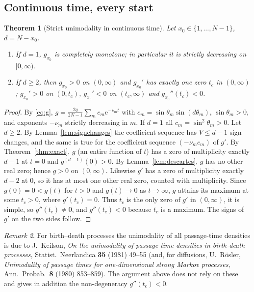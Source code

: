 \documentclass[11pt,a4paper]{article}
\newtheorem{theorem}{Theorem}[section]
\theoremstyle{definition}
\theoremstyle{remark}
\newtheorem{remark}[theorem]{Remark}
\newcommand{\ee}{\mathrm{e}}
\begin{document}
\subsection{Continuous time, every start}

\begin{theorem}[Strict unimodality in continuous time]\label{thm:unimodal-cont}
Let $x_0\in\{1,\dots,N-1\}$, $d=N-x_0$.
\begin{enumerate}
\item If $d=1$, $g_{x_0}$ is completely monotone; in particular it is strictly decreasing on $[0,\infty)$.
\item If $d\ge2$, then $g_{x_0}>0$ on $(0,\infty)$ and $g_{x_0}'$ has exactly one zero $t_c$ in $(0,\infty)$;
$g_{x_0}'>0$ on $(0,t_c)$, $g_{x_0}'<0$ on $(t_c,\infty)$ and $g_{x_0}''(t_c)<0$.
\end{enumerate}
\end{theorem}
\begin{proof}
By \eqref{eq:g}, $g=\frac{2q}{2N-1}\sum_mc_m\ee^{-\nu_mt}$ with $c_m=\sin\theta_m\sin(d\theta_m)$,
$\sin\theta_m>0$, and exponents $-\nu_m$ strictly decreasing in $m$. If $d=1$ all $c_m=\sin^2\theta_m>0$.
Let $d\ge2$. By Lemma~\ref{lem:signchanges} the coefficient sequence has $V\le d-1$ sign changes, and the
same is true for the coefficient sequence $(-\nu_mc_m)$ of $g'$. By Theorem~\ref{thm:exact}, $g$ (an entire
function of $t$) has a zero of multiplicity exactly $d-1$ at $t=0$ and $g^{(d-1)}(0)>0$. By
Lemma~\ref{lem:descartes}, $g$ has no other real zero; hence $g>0$ on $(0,\infty)$. Likewise $g'$ has a zero
of multiplicity exactly $d-2$ at $0$, so it has at most one other real zero, counted with multiplicity.
Since $g(0)=0<g(t)$ for $t>0$ and $g(t)\to0$ as $t\to\infty$, $g$ attains its maximum at some $t_c>0$, where
$g'(t_c)=0$. Thus $t_c$ is the only zero of $g'$ in $(0,\infty)$, it is simple, so $g''(t_c)\ne0$, and
$g''(t_c)<0$ because $t_c$ is a maximum. The signs of $g'$ on the two sides follow.
\end{proof}

\begin{remark}
For birth--death processes the unimodality of all passage-time densities is due to J.~Keilson,
\emph{On the unimodality of passage time densities in birth-death processes}, Statist.\ Neerlandica
\textbf{35} (1981) 49--55 (and, for diffusions, U.~R\"osler, \emph{Unimodality of passage times for
one-dimensional strong Markov processes}, Ann.\ Probab.\ \textbf{8} (1980) 853--859). The argument above
does not rely on these and gives in addition the non-degeneracy $g''(t_c)<0$.
\end{remark}
\end{document}
